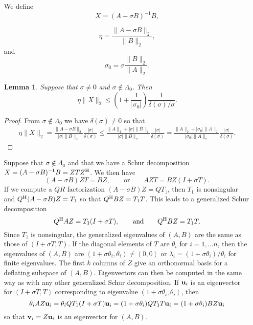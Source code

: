 \documentclass[12pt]{article}
\def\eqand{\qquad\mbox{and}\qquad}
\def\vec#1{{\bf #1}}
\def\H{{\rm H}}
\newtheorem{lemma}{Lemma}
\begin{document}
We define
\begin{equation}
  \label{eq:Xdef}
  X = (A-\sigma B)^{-1} B,
\end{equation}

\begin{equation}
  \label{eq:eta_def}
  \eta = \frac{\|A-\sigma B\|_2}{\|B\|_2},
\end{equation}
and
\begin{equation}
  \label{eq:sigma0_def}
  \sigma_0 = \sigma \frac{\|B\|_2}{\|A\|_2}.
\end{equation}
\begin{lemma}
  \label{lm:eta_X_bound}
  Suppose that $\sigma\neq 0$ and $\sigma \notin \Lambda_0$.  Then
  \begin{equation*}
    \eta \|X\|_2 \leq \left(1 + \frac{1}{|\sigma_0|}\right)
    \frac{1}{\delta(\sigma)/\sigma}.
  \end{equation*}
\end{lemma}
\begin{proof}
  From $\sigma \notin \Lambda_0$ we have $\delta(\sigma)\neq 0$ so that
  \begin{multline*}
    \eta \|X\|_2
    = \frac{\|A-\sigma B\|_2}{|\sigma| \|B\|_2} \frac{|\sigma|}{\delta(\sigma)}
    \leq \frac{\|A\|_2+|\sigma| \|B\|_2}{|\sigma|\|B\|_2} \frac{|\sigma|}{\delta(\sigma)}
    = \frac{\|A\|_2+|\sigma_0| \|A\|_2}{|\sigma_0|\|A\|_2} \frac{|\sigma|}{\delta(\sigma)}.
  \end{multline*}
\end{proof}

Suppose that $\sigma \notin \Lambda_0$ and that we have a Schur
decomposition $X = (A-\sigma B)^{-1} B = ZTZ^\H$.  We then have
\begin{equation*}
  (A -\sigma B) Z T = B Z,\qquad\mbox{or}\qquad
  A Z T = B Z (I +\sigma T).
\end{equation*}
If we compute a $QR$ factorization $(A -\sigma B)Z = QT_1$, then $T_1$
is nonsingular and $Q^\H (A-\sigma B) Z = T_1$ so that
$Q^\H BZ = T_1 T$.  This leads to a generalized Schur decomposition
\begin{equation*}
  Q^\H A Z = T_1(I+\sigma T),\eqand Q^\H BZ = T_1 T.
\end{equation*}
Since $T_1$ is nonsingular, the generalized eigenvalues of $(A,B)$ are
the same as those of $(I+\sigma T, T)$.  If the diagonal elements of
$T$ are $\theta_i$ for $i=1,\ldots n$, then the eigenvalues of $(A,B)$
are $(1+\sigma\theta_i, \theta_i)\neq (0,0)$ or
$\lambda_i = (1+\sigma \theta_i)/\theta_i$ for finite eigenvalues.
The first $k$ columns of $Z$ give an orthonormal basis for a deflating
subspace of $(A,B)$.  Eigenvectors can then be computed in the same
way as with any other generalized Schur decomposition.  If $\vec{u}_i$
is an eigenvector for $(I+\sigma T, T)$ corresponding to eigenvalue
$(1+\sigma\theta_i, \theta_i)$, then
\begin{equation*}
  \theta_i A Z \vec{u}_i 
  = \theta_i QT_1(I+\sigma T) \vec{u}_i
  = (1+\sigma \theta_i) Q T_1 T \vec{u}_i
  = (1+\sigma \theta_i) B Z \vec{u}_i
\end{equation*}
so that $\vec{v}_i = Z \vec{u}_i$ is an eigenvector for $(A,B)$.
\end{document}
